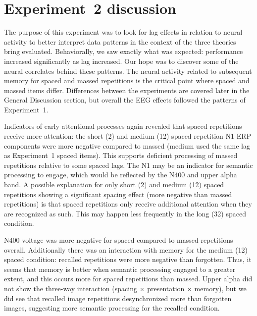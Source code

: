 

\section{Experiment~2 discussion}

The purpose of this experiment was to look for lag effects in relation to neural activity to better interpret data patterns in the context of the three theories bring evaluated.
Behaviorally, we saw exactly what was expected: performance increased significantly as lag increased.  Our hope was to discover some of the neural correlates behind these patterns. 
The neural activity related to subsequent memory for spaced and massed repetitions is the critical point where spaced and massed items differ.  Differences between the experiments are covered later in the General Discussion section, but overall the EEG effects followed the patterns of Experiment~1.


Indicators of early attentional processes again revealed that spaced repetitions receive more attention: the short (2) and medium (12) spaced repetition N1 ERP components were more negative compared to massed (medium used the same lag as Experiment~1 spaced items).  This supports deficient processing of massed repetitions relative to some spaced lags.  The N1 may be an indicator for semantic processing to engage, which would be reflected by the N400 and upper alpha band.
A possible explanation for only short (2) and medium (12) spaced repetitions showing a significant spacing effect (more negative than massed repetitions) is that spaced repetitions only receive additional attention when they are recognized as such.  This may happen less frequently in the long (32) spaced condition.

N400 voltage was more negative for spaced compared to massed repetitions overall.  Additionally there was an interaction with memory for the medium (12) spaced condition: recalled repetitions were more negative than forgotten.  Thus, it seems that memory is better when semantic processing engaged to a greater extent, and this occurs more for spaced repetitions than massed.  Upper alpha did not show the three-way interaction (spacing $\times$ presentation $\times$ memory), but we did see that recalled image repetitions desynchronized more than forgotten images, suggesting more semantic processing for the recalled condition.

